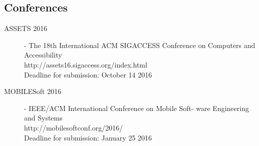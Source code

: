 \subsection{Conferences} 
\begin{description}
    \item[ASSETS 2016] - The 18th International ACM SIGACCESS Conference on Computers and Accessibility \\
http://assets16.sigaccess.org/index.html \\
Deadline for submission: October 14 2016
    \item[MOBILESoft 2016] - IEEE/ACM International Conference on Mobile Soft- ware Engineering and Systems \\
http://mobilesoftconf.org/2016/ \\
Deadline for submission: January 25 2016
 
\end{description}
